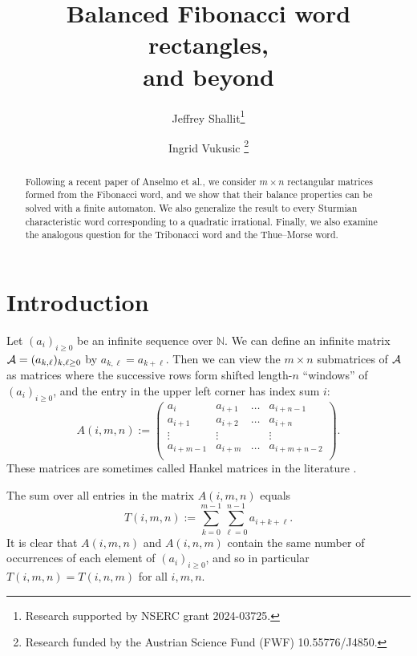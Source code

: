 \documentclass[final]{dmtcs-episciences}
\author[Jeffrey Shallit and Ingrid Vukusic]{Jeffrey Shallit\affiliationmark{1}\thanks{Research supported by NSERC grant 2024-03725.}
  \and Ingrid Vukusic \affiliationmark{2}\thanks{Research funded by the Austrian Science Fund (FWF) 10.55776/J4850.}
}
\title[Fibonacci word rectangles]{Balanced Fibonacci word rectangles,\\
and beyond}
\affiliation{
  School of Computer Science, University of Waterloo, Waterloo, Canada\\
  Department of Mathematics, University of York, York, United Kingdom
}
\theoremstyle{plain}
\theoremstyle{remark}
\def\Enn{\mathbb{N}}
\begin{document}
\maketitle
\begin{abstract}
Following a recent paper of Anselmo et al.,
we consider $m \times n$ rectangular matrices formed from the Fibonacci word, and
we show that their balance properties can be solved with a finite automaton.
We also generalize the result to every Sturmian characteristic word corresponding
to a quadratic irrational.  Finally, we also examine the analogous question for the Tribonacci word and the Thue--Morse word.
\end{abstract}


\section{Introduction}

Let $(a_i)_{i \geq 0}$ be an infinite sequence over $\Enn$.
We can define an infinite matrix ${\cal A} =(a_{k,\ell})_{k,\ell\geq 0}$ by $a_{k,\ell} = a_{k+\ell}$.  
Then we can view the $m \times n$ submatrices of $\cal A$ as matrices where the successive rows form shifted length-$n$ ``windows'' of $(a_i)_{i \geq 0}$, and
the entry in the upper left corner has index sum $i$:
\begin{equation}
    A(i,m,n)
    := \begin{pmatrix}
        a_i & a_{i+1} & \dots & a_{i+n-1} \\
        a_{i+1} & a_{i+2} & \dots & a_{i+n} \\
        \vdots & \vdots &     & \vdots \\
        a_{i+m-1} & a_{i+m} & \dots & a_{i+m+n-2} \\
    \end{pmatrix}.
\label{aimn}
\end{equation}
These matrices are sometimes called Hankel matrices in the literature \citep{Markovsky:2019}.

The sum over all entries in the matrix $A(i,m,n)$ equals
\begin{equation}
    T(i,m,n)
    := \sum_{k = 0}^{m-1} \sum_{\ell = 0}^{n-1} a_{i+k+\ell}.
\label{sum}
\end{equation}
It is clear that $A(i,m,n)$ and $A(i,n,m)$ contain the same number of occurrences of each element of $(a_i)_{i \geq 0}$, and so in particular $T(i,m,n) = T(i,n,m)$ for all $i,m,n$.
\end{document}
